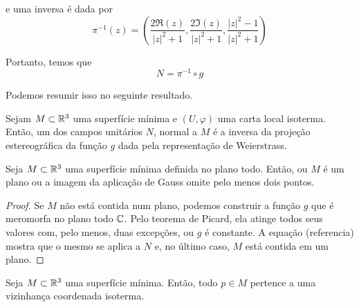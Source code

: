 \begin{exemplo}
	e uma inversa é dada por
	\begin{equation*}
		\pi^{-1}(z) = \left( \frac{2 \Re(z)}{|z|^2 + 1}, \frac{2 \Im(z)}{|z|^2 + 1}, \frac{|z|^2 - 1}{|z|^2 + 1} \right)
	\end{equation*}
	
	Portanto, temos que
	\begin{equation*}
		N = \pi^{-1} \circ g
	\end{equation*}
	
	Podemos resumir isso no seguinte resultado.
\end{exemplo}

\begin{prop}
	Sejam $M \subset \mathbb{R}^3$ uma superfície mínima e $(U, \varphi)$ uma carta local isoterma. Então, um dos campos unitários $N$, normal a $M$ é a inversa da projeção estereográfica da função $g$ dada pela representação de Weierstrass.
\end{prop}

\begin{corolario}
	Seja $M \subset \mathbb{R}^3$ uma superfície mínima definida no plano todo. Então, ou $M$ é um plano ou a imagem da aplicação de Gauss omite pelo menos dois pontos.
\end{corolario}

\begin{proof}
	Se $M$ não está contida num plano, podemos construir a função $g$ que é meromorfa no plano todo $\mathbb{C}$. Pelo teorema de Picard, ela atinge todos seus valores com, pelo menos, duas excepções, ou $g$ é constante. A equação (referencia) mostra que o mesmo se aplica a $N$ e, no último caso, $M$ está contida em um plano.
\end{proof}

\begin{teo}
	Seja $M \subset \mathbb{R}^3$ uma superfície mínima. Então, todo $p \in M$ pertence a uma vizinhança coordenada isoterma.
\end{teo}

